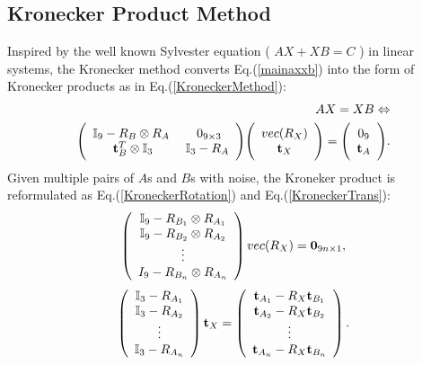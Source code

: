 \documentclass[twocolumn,10pt]{asme2ej}
\newcommand{\ttt}{{\bf t}}
\begin{document}
\subsection{\color{blue} Kronecker Product Method }
Inspired by the well known Sylvester equation ( $AX + XB = C$ ) in linear systems, the Kronecker method converts  Eq.(\ref{mainaxxb}) into the form of Kronecker products \cite{andreff1999line} as in Eq.(\ref{KroneckerMethod}):
\begin{equation}
\begin{split}
AX = XB  \Leftrightarrow\\
\Bigg(
\begin{array}{cc}
\mathbb{I}_{9} - R_{B} \otimes R_{A} \; & \; 0_{9 \times 3}\\
\ttt_{B}^{T} \otimes \mathbb{I}_{3} & \mathbb{I}_{3} - R_{A}
\end{array}
\Bigg) 
\Bigg(
\begin{array}{c}
vec(R_{X})\\
\ttt_{X}
\end{array}
\Bigg) =
\Bigg(
\begin{array}{c}
0_{9}\\
\ttt_{A}
\end{array}
\Bigg).
\end{split}
\label{KroneckerMethod}
\end{equation}
Given multiple pairs of $A$s and $B$s with noise, the Kroneker product is reformulated as Eq.(\ref{KroneckerRotation}) and Eq.(\ref{KroneckerTrans}):
\begin{equation}
\left(
\begin{array}{c}
\mathbb{I}_{9} - R_{B_{1}} \otimes R_{A_{1}}\\
\mathbb{I}_{9} - R_{B_{2}} \otimes R_{A_{2}}\\
\vdots\\
I_{9} - R_{B_{n}} \otimes R_{A_{n}}
\end{array}
\right) 
vec(R_{X})
 = {\bf{0}}_{9 n \times 1},
\label{KroneckerRotation}
\end{equation}
\begin{equation}
\left(
\begin{array}{c}
\mathbb{I}_{3} - R_{A_{1}} \\
\mathbb{I}_{3} - R_{A_{2}} \\
\vdots\\
\mathbb{I}_{3} - R_{A_{n}}
\end{array}
\right) 
{\ttt_{X}}
 = 
\left( 
\begin{array}{c}
{\bf{t}}_{A_{1}} - R_{X}{\bf{t}}_{B_{1}}\\
{\bf{t}}_{A_{2}} - R_{X}{\bf{t}}_{B_{2}}\\
\vdots\\
{\bf{t}}_{A_{n}} - R_{X}{\bf{t}}_{B_{n}}\\
\end{array}
\right).
\label{KroneckerTrans}
\end{equation}
\end{document}

